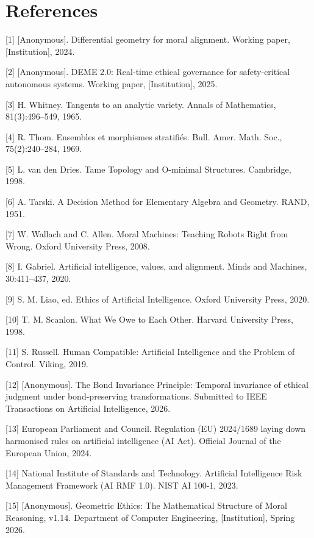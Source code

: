 \documentclass[12pt]{article}
\theoremstyle{plain}
\theoremstyle{definition}
\theoremstyle{remark}
\begin{document}
\section{References}\label{references}

{[}1{]} [Anonymous]. Differential geometry for moral alignment. Working
paper, [Institution], 2024.

{[}2{]} [Anonymous]. DEME 2.0: Real-time ethical governance for
safety-critical autonomous systems. Working paper, [Institution], 2025.

{[}3{]} H. Whitney. Tangents to an analytic variety. Annals of
Mathematics, 81(3):496--549, 1965.

{[}4{]} R. Thom. Ensembles et morphismes stratifiés. Bull. Amer. Math.
Soc., 75(2):240--284, 1969.

{[}5{]} L. van den Dries. Tame Topology and O-minimal Structures.
Cambridge, 1998.

{[}6{]} A. Tarski. A Decision Method for Elementary Algebra and
Geometry. RAND, 1951.

{[}7{]} W. Wallach and C. Allen. Moral Machines: Teaching Robots Right
from Wrong. Oxford University Press, 2008.

{[}8{]} I. Gabriel. Artificial intelligence, values, and alignment.
Minds and Machines, 30:411--437, 2020.

{[}9{]} S. M. Liao, ed. Ethics of Artificial Intelligence. Oxford
University Press, 2020.

{[}10{]} T. M. Scanlon. What We Owe to Each Other. Harvard University
Press, 1998.

{[}11{]} S. Russell. Human Compatible: Artificial Intelligence and the
Problem of Control. Viking, 2019.

{[}12{]} [Anonymous]. The Bond Invariance Principle: Temporal invariance
of ethical judgment under bond-preserving transformations. Submitted to
IEEE Transactions on Artificial Intelligence, 2026.

{[}13{]} European Parliament and Council. Regulation (EU) 2024/1689
laying down harmonised rules on artificial intelligence (AI Act).
Official Journal of the European Union, 2024.

{[}14{]} National Institute of Standards and Technology. Artificial
Intelligence Risk Management Framework (AI RMF 1.0). NIST AI 100-1,
2023.

{[}15{]} [Anonymous]. Geometric Ethics: The Mathematical Structure of
Moral Reasoning, v1.14. Department of Computer Engineering, [Institution], Spring 2026.
\end{document}
